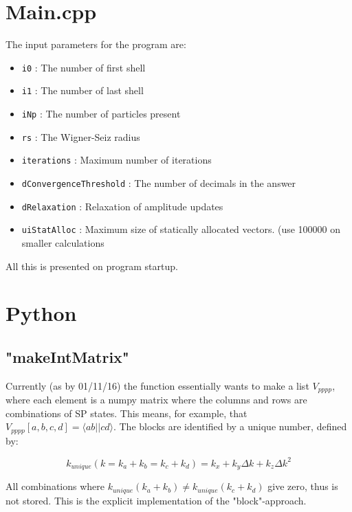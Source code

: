 \documentclass[10pt]{report}
\begin{document}
	\section{Main.cpp}
	The input parameters for the program are:
	
	\begin{itemize}
		\item \texttt{i0} : The number of first shell
		\item \texttt{i1} : The number of last shell
		\item \texttt{iNp} : The number of particles present
		\item \texttt{rs} : The Wigner-Seiz radius
		\item \texttt{iterations} : Maximum number of iterations
		\item \texttt{dConvergenceThreshold} : The number of decimals in the answer
		\item \texttt{dRelaxation} : Relaxation of amplitude updates
		\item \texttt{uiStatAlloc} : Maximum size of statically allocated vectors. (use 100000 on smaller calculations
	\end{itemize}
	
	All this is presented on program startup.
	
	\section{Python}
	\subsection{"makeIntMatrix"}
	Currently (as by 01/11/16) the function essentially wants to make a list $V_{pppp}$, where each element is a numpy matrix where the columns and rows are combinations of SP states. This means, for example, that $V_{pppp}[a,b,c,d] = \langle ab||cd\rangle$. The blocks are identified by a unique number, defined by:
	
	\begin{equation}
		k_{unique}(k=k_a+k_b = k_c+k_d) = k_x + k_y\Delta k + k_z\Delta k^2
	\end{equation}
	
	All combinations where $k_{unique}(k_a+k_b) \neq k_{unique}(k_c+k_d)$ give zero, thus is not stored. This is the explicit implementation of the "block"-approach.
	
\end{document}
